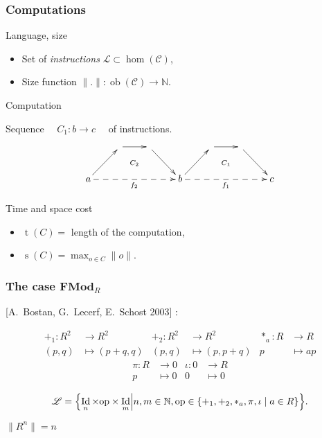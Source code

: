 \documentclass[10pt]{beamer}
\newcommand{\cat}[1]{\mathscr{#1}}
\newcommand{\lcat}[1]{\mathbf{#1}}
\newcommand{\C}{\cat{C}}
\renewcommand{\L}{\cat{L}}
\newcommand{\size}[1]{\lVert#1\rVert}
\DeclareMathOperator{\ob}{ob}
\DeclareMathOperator{\Id}{Id}
\newcommand{\N}{\mathbb{N}}
\newcommand{\ra}{\rightarrow}
\DeclareMathOperator{\Time}{t}
\DeclareMathOperator{\Space}{s}
\begin{document}
\begin{frame}
  \frametitle{Computations}

  \begin{block}{Language, size}
    \begin{itemize}
    \item Set of \emph{instructions} \hfill $\L \subset \hom(\C)$,
    \item Size function \hfill $\size{.} : \ob(\C)\ra\N$.
    \end{itemize}
  \end{block}

  \begin{block}{Computation}
    \begin{center}
      Sequence $\quad C_1:b\ra c\quad$ of instructions.
    \end{center}
  \end{block}

  \[\xymatrix{
    & \ar[r]\ar@{}[dr]|{C_2} & \ar[dr] &
    & \ar[r]\ar@{}[dr]|{C_1} & \ar[dr] \\
    a \ar[ur]\ar@{-->}[rrr]_{f_2} &&& b
    \ar[ur]\ar@{-->}[rrr]_{f_1} &&& c
  }\]

  \begin{block}{Time and space cost}
    \begin{itemize}
    \item $\Time(C) = $ length of the computation,
    \item $\Space(C) = \max_{o\in C}\size{o}$.
    \end{itemize}
  \end{block}

\end{frame}


\begin{frame}
  \frametitle{The case $\lcat{FMod}_R$}
  [A.~Bostan, G.~Lecerf, E.~Schost 2003] :

  \begin{align*}
    +_1 : R^2 &\ra R^2         &   +_2 : R^2&\ra R^2       &  *_a : R&\ra R\\
    (p,q)&\mapsto(p+q,q)  &      (p,q)&\mapsto(p,p+q) &       p&\mapsto ap
  \end{align*}
  \begin{align*}
    \pi : R&\ra 0     &  \iota : 0&\ra R   \\
          p&\mapsto0  &          0&\mapsto0
  \end{align*}
  
  \begin{block}{}
    \begin{equation*}
      \label{eq:linlang}
      \L = \Bigl\{\Id_n\times\mathrm{op}\times\Id_m \Bigl\lvert
      n,m\in\N, \mathrm{op}\in\{+_1,+_2,*_a,\pi,\iota\;|\;a\in R\} \Bigr\}
      \text{.}
    \end{equation*}
  \end{block}

  \begin{block}{}
    \begin{center}
      $\size{R^n} = n$
    \end{center}
  \end{block}

\end{frame}
\end{document}
